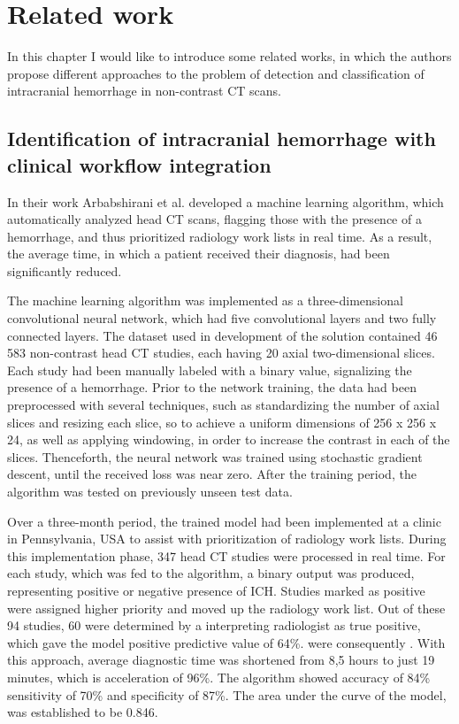 \chapter{Related work}
In this chapter I would like to introduce some related works, in which the authors propose different approaches to the problem of detection and classification of intracranial hemorrhage in non-contrast CT scans.

\section{Identification of intracranial hemorrhage with clinical workflow integration}
 
In their work \cite{relatedWork1} Arbabshirani et al. developed a machine learning algorithm, which automatically analyzed head CT scans, flagging those with the presence of a hemorrhage, and thus prioritized radiology work lists in real time. As a result, the average time, in which a patient received their diagnosis, had been significantly reduced.  

The machine learning algorithm was implemented as a three-dimensional convolutional neural network, which had five convolutional layers and two fully connected layers. The dataset used in development of the solution contained 46 583 non-contrast head CT studies, each having 20 axial two-dimensional slices. Each study had been manually labeled with a binary value, signalizing the presence of a hemorrhage. Prior to the network training, the data had been preprocessed with several techniques, such as standardizing the number of axial slices and resizing each slice, so to achieve a uniform dimensions of 256 x 256 x 24, as well as applying windowing, in order to increase the contrast in each of the slices. Thenceforth, the neural network was trained using stochastic gradient descent, until the received loss was near zero. After the training period, the algorithm was tested on previously unseen test data.

Over a three-month period, the trained model had been implemented at a clinic in Pennsylvania, USA to assist with prioritization of radiology work lists. During this implementation phase, 347 head CT studies were processed in real time. For each study, which was fed to the algorithm, a binary output was produced, representing positive or negative presence of ICH. Studies marked as positive were assigned higher priority and moved up the radiology work list. Out of these 94 studies, 60 were determined by a interpreting radiologist as true positive, which gave the model positive predictive value of 64\%. were consequently . With this approach, average diagnostic time was shortened from 8,5 hours to just 19 minutes, which is acceleration of 96\%. The algorithm showed accuracy of 84\% sensitivity of 70\%  and specificity of 87\%. The area under the curve of the model, was established to be 0.846.

